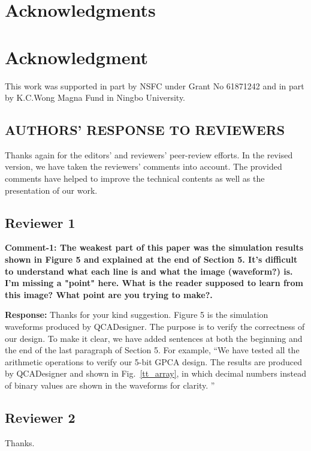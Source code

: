 \documentclass[9pt,journal,compsoc]{IEEEtran}
\begin{document}
\vspace{-2ex}
\ifCLASSOPTIONcompsoc
  \section*{Acknowledgments}
\else
  \section*{Acknowledgment}
\fi
This work was supported in part by NSFC under Grant No 61871242 and in part by K.C.Wong Magna Fund in Ningbo University.
\vspace{-2ex}
\ifCLASSOPTIONcaptionsoff
  \newpage
\fi
\tiny



\begin{appendices} 
	\setlength{\parindent}{0pt}
	\setlength{\parskip}{2em}
\section{AUTHORS’ RESPONSE TO REVIEWERS} 
\normalsize
Thanks again for the editors' and reviewers' peer-review efforts.
In the revised version, we have taken the reviewers' comments into account. 
The provided comments have helped to improve the technical contents as well as the presentation of our work.

\subsection{Reviewer 1}
{\bfseries Comment-1: The weakest part of this paper was the simulation results shown in Figure 5 and explained at the end of Section 5. It's difficult to understand what each line is and what the image (waveform?) is. I'm missing a "point" here. What is the reader supposed to learn from this image? What point are you trying to make?.}

{\bfseries Response:}  Thanks for your kind suggestion. Figure 5 is the simulation waveforms produced by QCADesigner. The purpose is to verify the correctness of our design. To make it clear, we have added sentences at both the beginning and the end of the last paragraph of Section 5. For example, ``We have tested all the arithmetic operations to verify our 5-bit GPCA design. The results are produced by QCADesigner and shown in Fig.~\ref{tt_array}, in which decimal numbers instead of binary values are shown in the waveforms for clarity. ''

\subsection{Reviewer 2}
Thanks.
  

\end{appendices}
\end{document}

